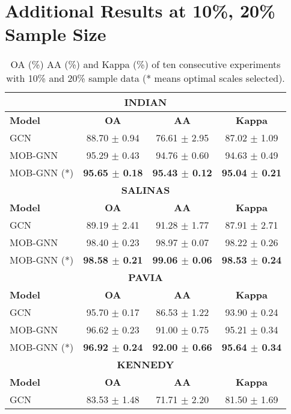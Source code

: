\section{Additional Results at 10\%, 20\% Sample Size} \label{sec:apx_results}

\begin{table}[h]
    \centering
    \caption{OA (\%) AA (\%) and Kappa (\%) of ten consecutive experiments with 10\% and 20\% sample data (* means optimal scales selected).}
    \begin{minipage}{0.49\textwidth}
\centering
\small
\begin{tabular}{|lccc|}
\hline
\multicolumn{4}{|c|}{\textbf{INDIAN}} \\
\hline
\textbf{Model} & \textbf{OA} & \textbf{AA} & \textbf{Kappa} \\
\hline
GCN & 88.70 $\pm$ 0.94 & 76.61 $\pm$ 2.95 & 87.02 $\pm$ 1.09 \\
MOB-GNN & 95.29 $\pm$ 0.43 & 94.76 $\pm$ 0.60 & 94.63 $\pm$ 0.49 \\
MOB-GNN (*) & \textbf{95.65 $\pm$ 0.18} & \textbf{95.43 $\pm$ 0.12} & \textbf{95.04 $\pm$ 0.21} \\
\hline
\multicolumn{4}{|c|}{\textbf{SALINAS}} \\
\hline
\textbf{Model} & \textbf{OA} & \textbf{AA} & \textbf{Kappa} \\
\hline
GCN & 89.19 $\pm$ 2.41 & 91.28 $\pm$ 1.77 & 87.91 $\pm$ 2.71 \\
MOB-GNN & 98.40 $\pm$ 0.23 & 98.97 $\pm$ 0.07 & 98.22 $\pm$ 0.26 \\
MOB-GNN (*) & \textbf{98.58 $\pm$ 0.21} & \textbf{99.06 $\pm$ 0.06} & \textbf{98.53 $\pm$ 0.24} \\
\hline
\multicolumn{4}{|c|}{\textbf{PAVIA}} \\
\hline
\textbf{Model} & \textbf{OA} & \textbf{AA} & \textbf{Kappa} \\
\hline
GCN & 95.70 $\pm$ 0.17 & 86.53 $\pm$ 1.22 & 93.90 $\pm$ 0.24 \\
MOB-GNN & 96.62 $\pm$ 0.23 & 91.00 $\pm$ 0.75 & 95.21 $\pm$ 0.34 \\
MOB-GNN (*) & \textbf{96.92 $\pm$ 0.24} & \textbf{92.00 $\pm$ 0.66} & \textbf{95.64 $\pm$ 0.34} \\
\hline
\multicolumn{4}{|c|}{\textbf{KENNEDY}} \\
\hline
\textbf{Model} & \textbf{OA} & \textbf{AA} & \textbf{Kappa} \\
\hline
GCN & 83.53 $\pm$ 1.48 & 71.71 $\pm$ 2.20 & 81.50 $\pm$ 1.69 \\

\end{tabular}
\end{minipage}
\end{table}
